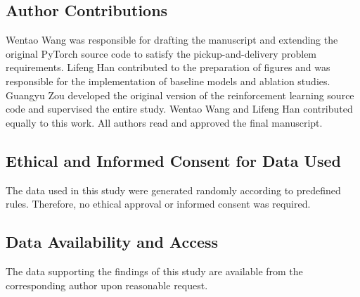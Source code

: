 \documentclass[pdflatex,sn-basic,Numbered]{sn-jnl}
\begin{document}
\subsection*{Author Contributions}
Wentao Wang was responsible for drafting the manuscript and extending the original PyTorch source code to satisfy the pickup-and-delivery problem requirements. Lifeng Han contributed to the preparation of figures and was responsible for the implementation of baseline models and ablation studies. Guangyu Zou developed the original version of the reinforcement learning source code and supervised the entire study. Wentao Wang and Lifeng Han contributed equally to this work. All authors read and approved the final manuscript.

\subsection*{Ethical and Informed Consent for Data Used}
The data used in this study were generated randomly according to predefined rules. Therefore, no ethical approval or informed consent was required.

\subsection*{Data Availability and Access}
The data supporting the findings of this study are available from the corresponding author upon reasonable request.

\FloatBarrier
\nocite{ma2023neuopt}

\end{document}
